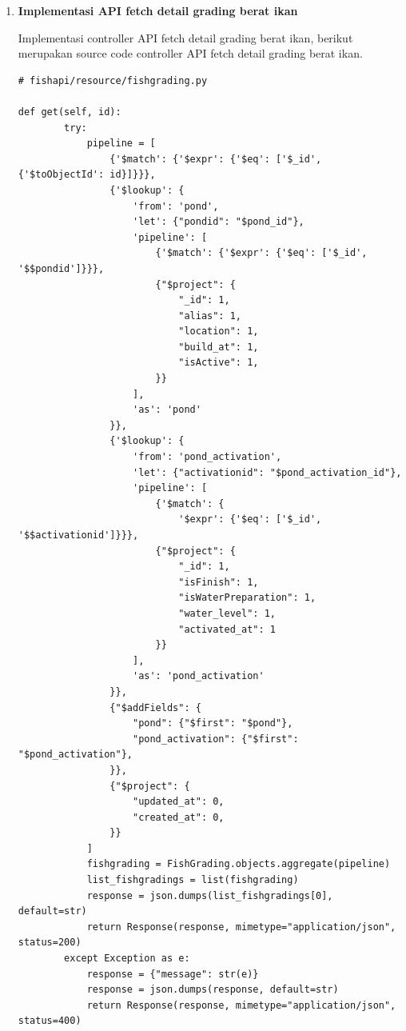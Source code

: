 \begin{enumerate}[1.]
\item \textbf{Implementasi API fetch detail grading berat ikan}

Implementasi controller API fetch detail grading berat ikan, berikut merupakan source code controller API fetch detail grading berat ikan.

\begin{lstlisting}
# fishapi/resource/fishgrading.py

def get(self, id):
        try:
            pipeline = [
                {'$match': {'$expr': {'$eq': ['$_id', {'$toObjectId': id}]}}},
                {'$lookup': {
                    'from': 'pond',
                    'let': {"pondid": "$pond_id"},
                    'pipeline': [
                        {'$match': {'$expr': {'$eq': ['$_id', '$$pondid']}}},
                        {"$project": {
                            "_id": 1,
                            "alias": 1,
                            "location": 1,
                            "build_at": 1,
                            "isActive": 1,
                        }}
                    ],
                    'as': 'pond'
                }},
                {'$lookup': {
                    'from': 'pond_activation',
                    'let': {"activationid": "$pond_activation_id"},
                    'pipeline': [
                        {'$match': {
                            '$expr': {'$eq': ['$_id', '$$activationid']}}},
                        {"$project": {
                            "_id": 1,
                            "isFinish": 1,
                            "isWaterPreparation": 1,
                            "water_level": 1,
                            "activated_at": 1
                        }}
                    ],
                    'as': 'pond_activation'
                }},
                {"$addFields": {
                    "pond": {"$first": "$pond"},
                    "pond_activation": {"$first": "$pond_activation"},
                }},
                {"$project": {
                    "updated_at": 0,
                    "created_at": 0,
                }}
            ]
            fishgrading = FishGrading.objects.aggregate(pipeline)
            list_fishgradings = list(fishgrading)
            response = json.dumps(list_fishgradings[0], default=str)
            return Response(response, mimetype="application/json", status=200)
        except Exception as e:
            response = {"message": str(e)}
            response = json.dumps(response, default=str)
            return Response(response, mimetype="application/json", status=400)
\end{lstlisting}



\end{enumerate}
